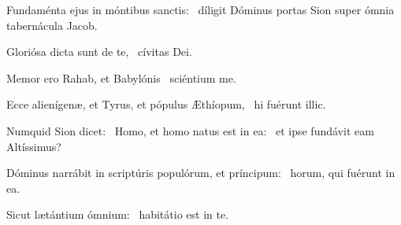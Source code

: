 \item Fundaménta ejus in móntibus sanctis:~\psstar{} díligit Dóminus portas Sion super ómnia tabernácula Jacob.

\item Gloriósa dicta sunt de te,~\psstar{} cívitas Dei.

\item Memor ero Rahab, et Babylónis~\psstar{} sciéntium me.

\item Ecce alienígenæ, et Tyrus, et pópulus Æthíopum,~\psstar{} hi fuérunt illic.

\item Numquid Sion dicet:~\pscross{} Homo, et homo natus est in ea:~\psstar{} et ipse fundávit eam Altíssimus?

\item Dóminus narrábit in scriptúris populórum, et príncipum:~\psstar{} horum, qui fuérunt in ea.

\item Sicut lætántium ómnium:~\psstar{} habitátio est in te.
